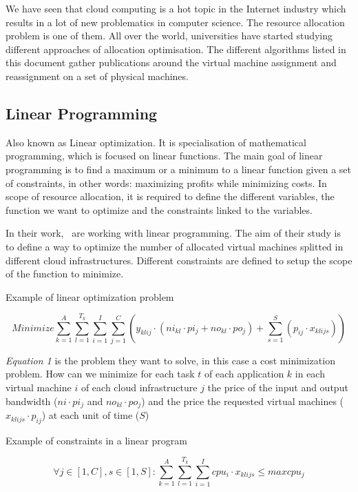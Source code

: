 We have seen that cloud computing is a hot topic in the Internet industry
which results in a lot of new problematics in computer science. The resource
allocation problem is one of them. All over the world, universities have
started studying different approaches of allocation optimisation. The different
algorithms listed in this document gather publications around the virtual machine
assignment and reassignment on a set of physical machines.

\subsection{Linear Programming}

Also known as Linear optimization. It is specialisation of mathematical
programming, which is focused on linear functions. The main goal of linear
programming is to find a maximum or a minimum to a linear function given a set
of constraints, in other words: maximizing profits while minimizing costs. In
scope of resource allocation, it is required to define the different variables,
the function we want to optimize and the constraints linked to the variables.

In their work,~\cite*{allocationHybrid} are working with linear programming. The aim
of their study is to define a way to optimize the number of allocated virtual
machines splitted in different cloud infrastructures.  Different constraints
are defined to setup the scope of the function to minimize.

\begin{figequation}
	\caption{Example of linear optimization problem}
	\[
		Minimize
		\sum_{k=1}^A \sum_{l=1}^{T_k} \sum_{i=1}^I \sum_{j=1}^C ( y_{klij} \cdot (ni_{kl} \cdot {pi_j} + no_{kl} \cdot po_j) + \sum_{s=1}^S ( p_{ij} \cdot x_{klijs} ))
	\]
\end{figequation}

\textit{Equation 1} is the problem they want to solve, in this case a cost
minimization problem. How can we minimize for each task $t$ of each application
$k$ in each virtual machine $i$ of each cloud infrastructure $j$ the price of
the input and output bandwidth ($ni \cdot pi_j$ and $no_{kl} \cdot po_j$) and
the price the requested virtual machines ($x_{klijs} \cdot p_{ij}$) at each
unit of time ($S$)

\begin{figequation}
	\caption{Example of constraints in a linear program}
	\[
		\forall j \in [1,C], s \in [1,S]:
		\sum_{k=1}^{A} \sum_{l=1}^{T_k} \sum_{i=1}^{I} cpu_i \cdot x_{klijs} \leq maxcpu_j
	\]
\end{figequation}

